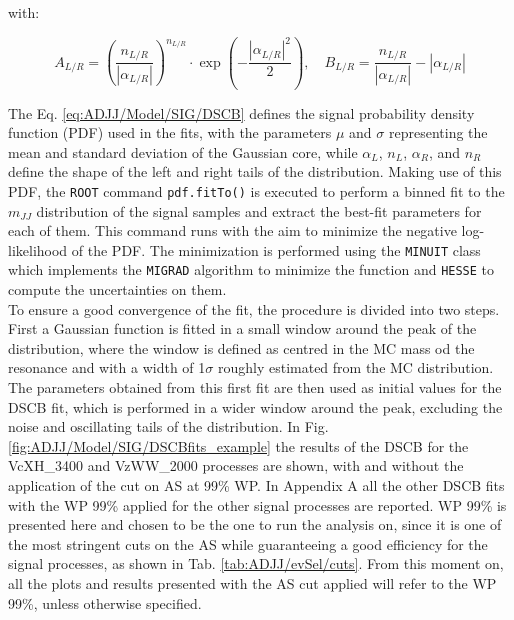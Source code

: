 \noindent with: 

\begin{equation}\label{eq:ADJJ/Model/SIG/DSCB_constants}
A_{L/R} = \left( \frac{n_{L/R}}{|\alpha_{L/R}|} \right)^{n_{L/R}} \cdot \exp\left( -\frac{|\alpha_{L/R}|^2}{2} \right), \quad B_{L/R} = \frac{n_{L/R}}{|\alpha_{L/R}|} - |\alpha_{L/R}|
\end{equation}

\noindent The Eq. \ref{eq:ADJJ/Model/SIG/DSCB} defines the signal probability density function (PDF) used in the fits, with the parameters $\mu$ and $\sigma$ representing the mean and standard deviation of the Gaussian core, while $\alpha_L$, $n_L$, $\alpha_R$, and $n_R$ define the shape of the left and right tails of the distribution.
Making use of this PDF, the \texttt{ROOT} command \texttt{pdf.fitTo()} is executed to perform a binned fit to the $m_{JJ}$ distribution of the signal samples and extract the best-fit parameters for each of them.
This command runs with the aim to minimize the negative log-likelihood of the PDF.
The minimization is performed using the \texttt{MINUIT} class which implements the \texttt{MIGRAD} algorithm to minimize the function and \texttt{HESSE} to compute the uncertainties on them.\\
To ensure a good convergence of the fit, the procedure is divided into two steps.
First a Gaussian function is fitted in a small window around the peak of the distribution, where the window is defined as centred in the MC mass od the resonance and with a width of 1$\sigma$ roughly estimated from the MC distribution.
The parameters obtained from this first fit are then used as initial values for the DSCB fit, which is performed in a wider window around the peak, excluding the noise and oscillating tails of the distribution.
In Fig. \ref{fig:ADJJ/Model/SIG/DSCBfits_example} the results of the DSCB for the VcXH\_3400 and VzWW\_2000 processes are shown, with and without the application of the cut on AS at 99\% WP.
In Appendix A all the other DSCB fits with the WP 99\% applied for the other signal processes are reported.
WP 99\% is presented here and chosen to be the one to run the analysis on, since it is one of the most stringent cuts on the AS while guaranteeing a good efficiency for the signal processes, as shown in Tab. \ref{tab:ADJJ/evSel/cuts}.
From this moment on, all the plots and results presented with the AS cut applied will refer to the WP 99\%, unless otherwise specified.

